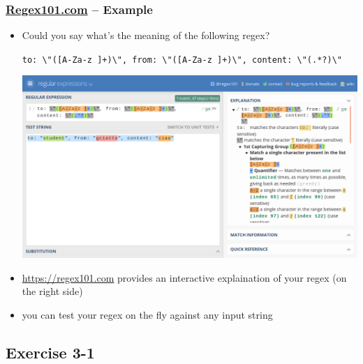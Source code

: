 \documentclass[presentation]{beamer}\mode<presentation>{\usetheme{AMSCesenaPurpleAndGold}}
\begin{document}
\begin{frame}
\frametitle{\href{https://regex101.com/}{Regex101.com} -- Example}

\begin{itemize}
\item Could you say what's the meaning of the following regex?
%
\begin{center}
\small\alert{
\texttt{to:\,\textbackslash{}"([A-Za-z ]+)\textbackslash{}",\,from:\,\textbackslash{}"([A-Za-z ]+)\textbackslash{}",\,content:\,\textbackslash{}"(.*?)\textbackslash{}"}}
\end{center}
%

%
\begin{center}
\includegraphics[width=.7\linewidth]{./img/regex101.png}
\end{center}

\item \url{https://regex101.com} provides an interactive explaination of your regex (on the right side) 

\item you can test your regex on the fly against any input string

\end{itemize}  
\end{frame}

\subsection{Exercise 3-1} 
\end{document}
